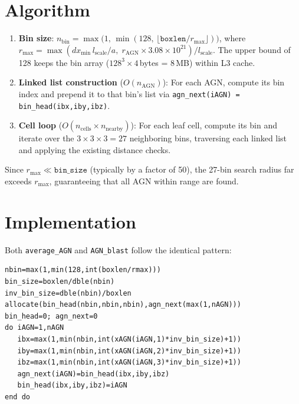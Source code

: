 \documentclass[11pt,fleqn]{book}
\begin{document}
\section{Algorithm}

\begin{enumerate}[leftmargin=2em]
  \item \textbf{Bin size}: $n_\mathrm{bin} = \max\bigl(1,\,\min(128,\,\lfloor\texttt{boxlen}/r_\mathrm{max}\rfloor)\bigr)$, where $r_\mathrm{max} = \max(dx_\mathrm{min}\,l_\mathrm{scale}/a,\; r_\mathrm{AGN}\times 3.08\times10^{21})/l_\mathrm{scale}$. The upper bound of 128 keeps the bin array ($128^3 \times 4$\,bytes = 8\,MB) within L3 cache.
  \item \textbf{Linked list construction} ($O(n_\mathrm{AGN})$): For each AGN, compute its bin index and prepend it to that bin's list via \texttt{agn\_next(iAGN) = bin\_head(ibx,iby,ibz)}.
  \item \textbf{Cell loop} ($O(n_\mathrm{cells} \times n_\mathrm{nearby})$): For each leaf cell, compute its bin and iterate over the $3\times3\times3=27$ neighboring bins, traversing each linked list and applying the existing distance checks.
\end{enumerate}

Since $r_\mathrm{max} \ll \texttt{bin\_size}$ (typically by a factor of 50), the 27-bin search radius far exceeds $r_\mathrm{max}$, guaranteeing that all AGN within range are found.

\section{Implementation}

Both \texttt{average\_AGN} and \texttt{AGN\_blast} follow the identical pattern:

\begin{codebox}
\begin{lstlisting}[style=fortran]
nbin=max(1,min(128,int(boxlen/rmax)))
bin_size=boxlen/dble(nbin)
inv_bin_size=dble(nbin)/boxlen
allocate(bin_head(nbin,nbin,nbin),agn_next(max(1,nAGN)))
bin_head=0; agn_next=0
do iAGN=1,nAGN
   ibx=max(1,min(nbin,int(xAGN(iAGN,1)*inv_bin_size)+1))
   iby=max(1,min(nbin,int(xAGN(iAGN,2)*inv_bin_size)+1))
   ibz=max(1,min(nbin,int(xAGN(iAGN,3)*inv_bin_size)+1))
   agn_next(iAGN)=bin_head(ibx,iby,ibz)
   bin_head(ibx,iby,ibz)=iAGN
end do
\end{lstlisting}
\end{codebox}
\end{document}
